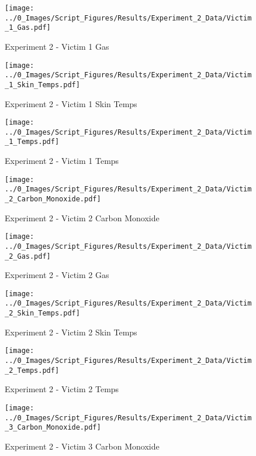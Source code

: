 	\clearpage

	\begin{figure}[H]
		\centering
		\texttt{[image: ../0\_Images/Script\_Figures/Results/Experiment\_2\_Data/Victim\_1\_Gas.pdf]}
		\caption[]{Experiment 2 - Victim 1 Gas}
	\end{figure}
 

	\begin{figure}[H]
		\centering
		\texttt{[image: ../0\_Images/Script\_Figures/Results/Experiment\_2\_Data/Victim\_1\_Skin\_Temps.pdf]}
		\caption[]{Experiment 2 - Victim 1 Skin Temps}
	\end{figure}
 
	\clearpage

	\begin{figure}[H]
		\centering
		\texttt{[image: ../0\_Images/Script\_Figures/Results/Experiment\_2\_Data/Victim\_1\_Temps.pdf]}
		\caption[]{Experiment 2 - Victim 1 Temps}
	\end{figure}
 

	\begin{figure}[H]
		\centering
		\texttt{[image: ../0\_Images/Script\_Figures/Results/Experiment\_2\_Data/Victim\_2\_Carbon\_Monoxide.pdf]}
		\caption[]{Experiment 2 - Victim 2 Carbon Monoxide}
	\end{figure}
 
	\clearpage

	\begin{figure}[H]
		\centering
		\texttt{[image: ../0\_Images/Script\_Figures/Results/Experiment\_2\_Data/Victim\_2\_Gas.pdf]}
		\caption[]{Experiment 2 - Victim 2 Gas}
	\end{figure}
 

	\begin{figure}[H]
		\centering
		\texttt{[image: ../0\_Images/Script\_Figures/Results/Experiment\_2\_Data/Victim\_2\_Skin\_Temps.pdf]}
		\caption[]{Experiment 2 - Victim 2 Skin Temps}
	\end{figure}
 
	\clearpage

	\begin{figure}[H]
		\centering
		\texttt{[image: ../0\_Images/Script\_Figures/Results/Experiment\_2\_Data/Victim\_2\_Temps.pdf]}
		\caption[]{Experiment 2 - Victim 2 Temps}
	\end{figure}
 

	\begin{figure}[H]
		\centering
		\texttt{[image: ../0\_Images/Script\_Figures/Results/Experiment\_2\_Data/Victim\_3\_Carbon\_Monoxide.pdf]}
		\caption[]{Experiment 2 - Victim 3 Carbon Monoxide}
	\end{figure}
 

